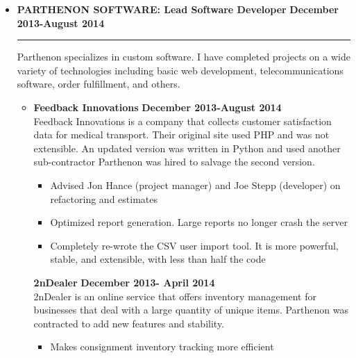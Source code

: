 \documentclass[overlapped]{res}
\begin{document}
\begin{resume}
\begin{itemize}[leftmargin=0in]
    \item[] 
        \textbf{PARTHENON SOFTWARE: Lead Software Developer} \hfill \textbf{December 2013-August 2014} \\[-0.1in] \rule{\textwidth}{0.5pt}
        Parthenon specializes in custom software. I have completed projects on a wide variety of technologies including basic 
        web development, telecommunications software, order fulfillment, and others. \vspace{0.125in}
        \begin{itemize}[leftmargin=0in]
            \item[] 
                \begin{samepage}
                    \textbf{Feedback Innovations} \hfill \textbf{December 2013-August 2014} \\
                    Feedback Innovations is a company that collects customer satisfaction data for medical transport. Their original site 
                    used PHP and was not extensible.  An updated version was written in Python and used another sub-contractor Parthenon 
                    was hired to salvage the second version.
                    \begin{itemize}
                        \item[\textbullet] Advised Jon Hance (project manager) and Joe Stepp (developer) on refactoring and estimates
                        \item[\textbullet] Optimized report generation. Large reports no longer crash the server
                        \item[\textbullet] Completely re-wrote the CSV user import tool. It is more powerful, stable, and extensible, with
                                           less than half the code
                    \end{itemize}
                \end{samepage}
                \begin{samepage}
                    \textbf{2nDealer} \hfill \textbf{December 2013- April 2014} \\
                    2nDealer is an online service that offers inventory management for businesses that deal with a large quantity of unique items. 
                    Parthenon was contracted to add new features and stability.
                    \begin{itemize}
                        \item[\textbullet] Makes consignment inventory tracking more efficient

\end{itemize}
\end{samepage}
\end{itemize}
\end{itemize}
\end{resume}
\end{document}
